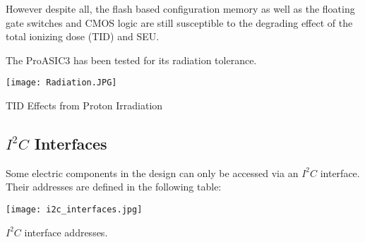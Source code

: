 However despite all, the flash based configuration memory as well as the floating gate switches and CMOS logic are still susceptible to the degrading effect of the total ionizing dose (TID) and SEU.
\newline

The ProASIC3 has been tested for its radiation tolerance.

\begin{table}[H]
	\centering
    \texttt{[image: Radiation.JPG]}
    \caption[]{TID Effects from Proton Irradiation}
	\label{tab:radiation}
\end{table}



\subsection{\texorpdfstring{$I^2C$}{TEXT} Interfaces}
\label{sec:i2c_interfaces}
Some electric components in the design can only be accessed via an $I^2C$ interface. 
Their addresses are defined in the following table:
\begin{table}[H]
	\centering
    \texttt{[image: i2c\_interfaces.jpg]}
    \caption[$I^2C$ Interfaces]{$I^2C$ interface addresses.}
	\label{tab:i2c_interfaces}
\end{table}
